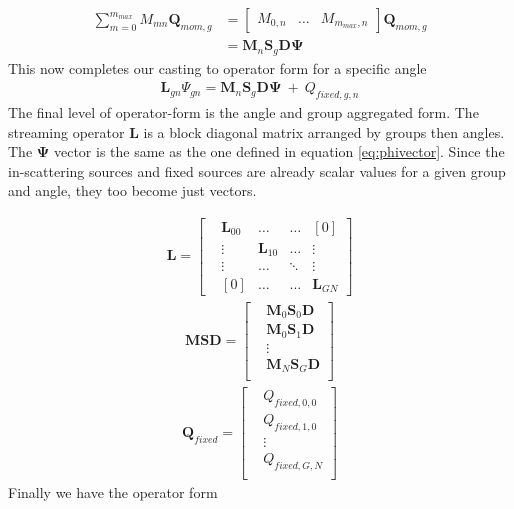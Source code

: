 \documentclass[11pt,letterpaper,titlepage]{article}
\numberwithin{equation}{section}
\begin{document}
\begin{align*}
\sum_{m=0}^{m_{max}}M_{mn} \mathbf{Q}_{mom,g}
&= 
\begin{bmatrix}
M_{0,n} &\hdots &M_{m_{max},n}
\end{bmatrix}
\mathbf{Q}_{mom,g} \\
&= \mathbf{M}_n \mathbf{S}_g \mathbf{D} \mathbf{\Psi}
\end{align*}
\newline
This now completes our casting to operator form for a specific angle
\begin{align}
\mathbf{L}_{gn}\Psi_{gn} = \mathbf{M}_n \mathbf{S}_g \mathbf{D} \mathbf{\Psi} \ + \ Q_{fixed,g,n}
\end{align}
\newline
The final level of operator-form is the angle and group aggregated form. The streaming operator $\mathbf{L}$ is a block diagonal matrix arranged by groups then angles. The $\mathbf{\Psi}$ vector is the same as the one defined in equation \ref{eq:phivector}. Since the in-scattering sources and fixed sources are already scalar values for a given group and angle, they too become just vectors. 

\begin{equation}
\begin{aligned}
\mathbf{L} = 
\begin{bmatrix}
&\mathbf{L}_{00} 
&\hdots  
&\hdots 
&[0] \\
&\vdots
&\mathbf{L}_{10}
&\hdots
&\vdots \\
&\vdots 
&\hdots 
&\ddots 
&\vdots \\
&[0]
&\hdots 
&\hdots 
&\mathbf{L}_{GN} 
\end{bmatrix}
\end{aligned}
\end{equation}
\begin{equation}
\begin{aligned}
\mathbf{MSD} = 
\begin{bmatrix}
&\mathbf{M}_0\mathbf{S}_0\mathbf{D} \\
&\mathbf{M}_0\mathbf{S}_1\mathbf{D} \\
&\vdots \\
&\mathbf{M}_N\mathbf{S}_G\mathbf{D} \\
\end{bmatrix}
\end{aligned}
\end{equation}
\begin{equation}
\begin{aligned}
\mathbf{Q}_{fixed} = 
\begin{bmatrix}
&Q_{fixed,0,0} \\
&Q_{fixed,1,0} \\
&\vdots \\
&Q_{fixed,G,N} \\
\end{bmatrix}
\end{aligned}
\end{equation}
\newline
Finally we have the operator form
\end{document}
